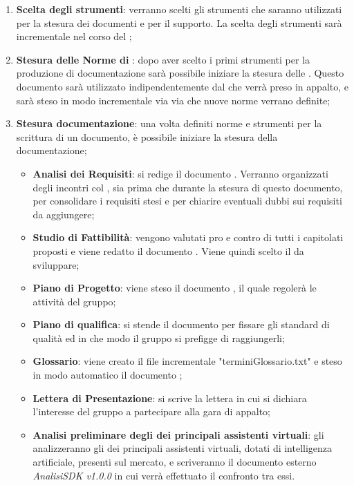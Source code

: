 \documentclass[./PianoDiProgetto.tex]{subfiles}
\begin{document}
  \begin{enumerate}
		\item \textbf{Scelta degli strumenti}: verranno scelti gli strumenti che saranno utilizzati per la stesura dei documenti e per il supporto. La scelta degli strumenti sarà incrementale nel corso del ;
		\item \textbf{Stesura delle Norme di }: dopo aver scelto i primi strumenti per la produzione di documentazione sarà possibile iniziare la stesura delle \NPdocRR. Questo documento sarà utilizzato indipendentemente dal  che verrà preso in appalto, e sarà steso in modo incrementale via via che nuove norme verrano definite;
		\item \textbf{Stesura documentazione}: una volta definiti norme e strumenti per la scrittura di un documento, è possibile iniziare la stesura della documentazione;
    \begin{itemize}
      \item \textbf{Analisi dei Requisiti}: si redige il documento \ARdocRR. Verranno organizzati degli incontri col , sia prima che durante la stesura di questo documento, per consolidare i requisiti stesi e per chiarire eventuali dubbi sui requisiti da aggiungere;
      \item \textbf{Studio di Fattibilità}: vengono valutati pro e contro di tutti i capitolati proposti e viene redatto il documento \SFdocRR. Viene quindi scelto il  da sviluppare;
      \item \textbf{Piano di Progetto}: viene steso il documento \PPdocRR, il quale regolerà le attività del gruppo;
      \item \textbf{Piano di qualifica}: si stende il documento \PQdocRR per fissare gli standard di qualità ed in che modo il gruppo si prefigge di raggiungerli;
      \item \textbf{Glossario}: viene creato il file incrementale "terminiGlossario.txt" e steso in modo automatico il documento \GldocRR;
      \item \textbf{Lettera di Presentazione}: si scrive la lettera in cui si dichiara l'interesse del gruppo a partecipare alla gara di appalto;
      \item \textbf{Analisi preliminare degli  dei principali assistenti virtuali}: gli \ANP{} analizzeranno gli  dei principali assistenti virtuali, dotati di intelligenza artificiale, presenti sul mercato, e scriveranno il documento esterno \textit{AnalisiSDK v1.0.0} in cui verrà effettuato il confronto tra  essi.
    \end{itemize}
  \end{enumerate}
\end{document}
